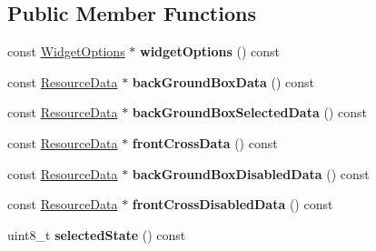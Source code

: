 \subsection*{Public Member Functions}
\begin{DoxyCompactItemize}
\item 
\mbox{\label{structflatbuffers_1_1CheckBoxOptions_acfcc4ed4fa0f2802486a7ae916259d73}} 
const \hyperlink{structflatbuffers_1_1WidgetOptions}{Widget\+Options} $\ast$ {\bfseries widget\+Options} () const
\item 
\mbox{\label{structflatbuffers_1_1CheckBoxOptions_a9b911774361ff94789e47ce739885aed}} 
const \hyperlink{structflatbuffers_1_1ResourceData}{Resource\+Data} $\ast$ {\bfseries back\+Ground\+Box\+Data} () const
\item 
\mbox{\label{structflatbuffers_1_1CheckBoxOptions_ac08a44ec40b34b01151b2babb06416d6}} 
const \hyperlink{structflatbuffers_1_1ResourceData}{Resource\+Data} $\ast$ {\bfseries back\+Ground\+Box\+Selected\+Data} () const
\item 
\mbox{\label{structflatbuffers_1_1CheckBoxOptions_a5596755fde243c1c5f0287909e026943}} 
const \hyperlink{structflatbuffers_1_1ResourceData}{Resource\+Data} $\ast$ {\bfseries front\+Cross\+Data} () const
\item 
\mbox{\label{structflatbuffers_1_1CheckBoxOptions_a9f75d991a4757aee53148186a1b5af94}} 
const \hyperlink{structflatbuffers_1_1ResourceData}{Resource\+Data} $\ast$ {\bfseries back\+Ground\+Box\+Disabled\+Data} () const
\item 
\mbox{\label{structflatbuffers_1_1CheckBoxOptions_af24c3f15c8e5fa92903a42b06a6da974}} 
const \hyperlink{structflatbuffers_1_1ResourceData}{Resource\+Data} $\ast$ {\bfseries front\+Cross\+Disabled\+Data} () const
\item 
\mbox{\label{structflatbuffers_1_1CheckBoxOptions_a99762dc65094e4ab00bce250737a898a}} 
uint8\+\_\+t {\bfseries selected\+State} () const
\item 

\end{DoxyCompactItemize}
